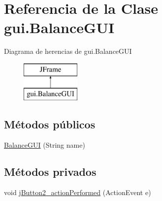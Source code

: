 \hypertarget{classgui_1_1BalanceGUI}{}\section{Referencia de la Clase gui.\+Balance\+G\+UI}
\label{classgui_1_1BalanceGUI}
Diagrama de herencias de gui.\+Balance\+G\+UI\begin{figure}[H]
\begin{center}
\leavevmode
\includegraphics[height=2.000000cm]{classgui_1_1BalanceGUI}
\end{center}
\end{figure}
\subsection*{Métodos públicos}
\begin{DoxyCompactItemize}
\item 
\mbox{\hyperlink{classgui_1_1BalanceGUI_ac60ad0190bd317910d391735bb8ff888}{Balance\+G\+UI}} (String name)
\end{DoxyCompactItemize}
\subsection*{Métodos privados}
\begin{DoxyCompactItemize}
\item 
void \mbox{\hyperlink{classgui_1_1BalanceGUI_a19432b0f32e43be23b0b7a9bab9ee045}{j\+Button2\+\_\+action\+Performed}} (Action\+Event e)
\end{DoxyCompactItemize}
